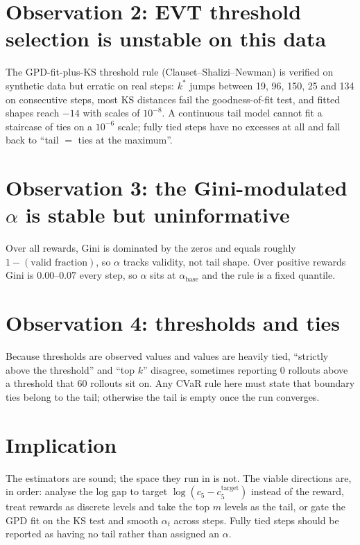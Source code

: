 \documentclass[11pt]{article}
\begin{document}
\section{Observation 2: EVT threshold selection is unstable on this data}

The GPD-fit-plus-KS threshold rule (Clauset--Shalizi--Newman) is verified on synthetic data but erratic on real steps: $k^\ast$ jumps between 19, 96, 150, 25 and 134 on consecutive steps, most KS distances fail the goodness-of-fit test, and fitted shapes reach $-14$ with scales of $10^{-8}$. A continuous tail model cannot fit a staircase of ties on a $10^{-6}$ scale; fully tied steps have no excesses at all and fall back to ``tail $=$ ties at the maximum''.

\section{Observation 3: the Gini-modulated \texorpdfstring{$\alpha$}{alpha} is stable but uninformative}

Over all rewards, Gini is dominated by the zeros and equals roughly $1 - (\text{valid fraction})$, so $\alpha$ tracks validity, not tail shape. Over positive rewards Gini is $0.00$--$0.07$ every step, so $\alpha$ sits at $\alpha_{\mathrm{base}}$ and the rule is a fixed quantile.

\section{Observation 4: thresholds and ties}

Because thresholds are observed values and values are heavily tied, ``strictly above the threshold'' and ``top $k$'' disagree, sometimes reporting 0 rollouts above a threshold that 60 rollouts sit on. Any CVaR rule here must state that boundary ties belong to the tail; otherwise the tail is empty once the run converges.

\section{Implication}

The estimators are sound; the space they run in is not. The viable directions are, in order: analyse the log gap to target $\log(c_5 - c_5^{\mathrm{target}})$ instead of the reward, treat rewards as discrete levels and take the top $m$ levels as the tail, or gate the GPD fit on the KS test and smooth $\alpha_t$ across steps. Fully tied steps should be reported as having no tail rather than assigned an $\alpha$.
\end{document}
